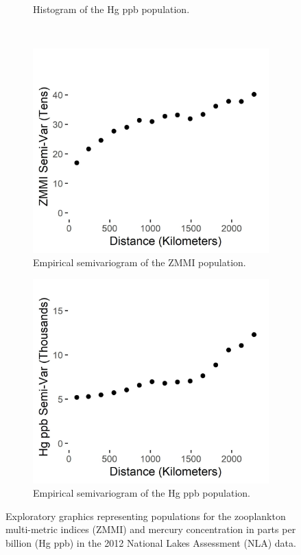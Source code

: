 \documentclass[]{elsarticle} %
\begin{document}
\begin{figure}
\begin{subfigure}{0.49\textwidth}
  \caption{Histogram of the Hg ppb population.}
  \label{fig:mercury_hist}
\end{subfigure} \\
\begin{subfigure}{0.49\textwidth}
  \centering
  \includegraphics[width = 1\linewidth]{figures/zmmi_sv.jpeg}
  \caption{Empirical semivariogram of the ZMMI population.}
  \label{fig:zmmi_sv_plot}
\end{subfigure}
\begin{subfigure}{0.49\textwidth}
  \centering
  \includegraphics[width = 1\linewidth]{figures/mercury_sv.jpeg}
  \caption{Empirical semivariogram of the Hg ppb population.}
  \label{fig:mercury_sv_plot}
\end{subfigure}
\caption{Exploratory graphics representing populations for the zooplankton multi-metric indices (ZMMI) and mercury concentration in parts per billion (Hg ppb) in the 2012 National Lakes Assessment (NLA) data.}
\label{fig:zmmi}
\end{figure}
\end{document}

